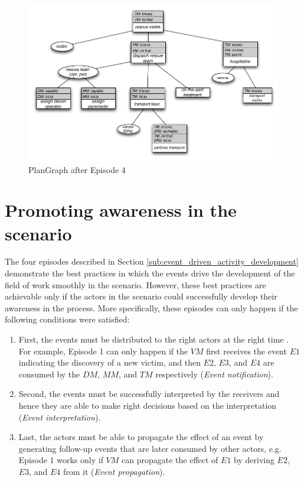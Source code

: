 \begin{figure}[htbp] %
	\centering
	\includegraphics{plangraph_ep4.pdf} 
	\caption{PlanGraph after Episode 4}
	\label{fig:plangraph_ep4}
\end{figure}

\section{Promoting awareness in the scenario} %
\label{sec:promoting_awareness_in_the_scenario}
The four episodes described in Section \ref{sub:event_driven_activity_development} demonstrate the best practices in which the events drive the development of the field of work smoothly in the scenario. However, these best practices are achievable only if the actors in the scenario could successfully develop their awareness in the process. More specifically, these episodes can only happen if the following conditions were satisfied:

\begin{enumerate}
	\item First, the events must be distributed to the right actors at the right time . For example, Episode 1 can only happen if the $VM$ first receives the event $E1$ indicating the discovery of a new victim, and then $E2$, $E3$, and $E4$ are consumed by the $DM$, $MM$, and $TM$ respectively (\emph{Event notification}).
	\item Second, the events must be successfully interpreted by the receivers and hence they are able to make right decisions based on the interpretation (\emph{Event interpretation}). 
	\item Last, the actors must be able to propagate the effect of an event by generating follow-up events that are later consumed by other actors, e.g. Episode 1 works only if $VM$ can propagate the effect of $E1$ by deriving $E2$, $E3$, and $E4$ from it (\emph{Event propagation}).
\end{enumerate}

